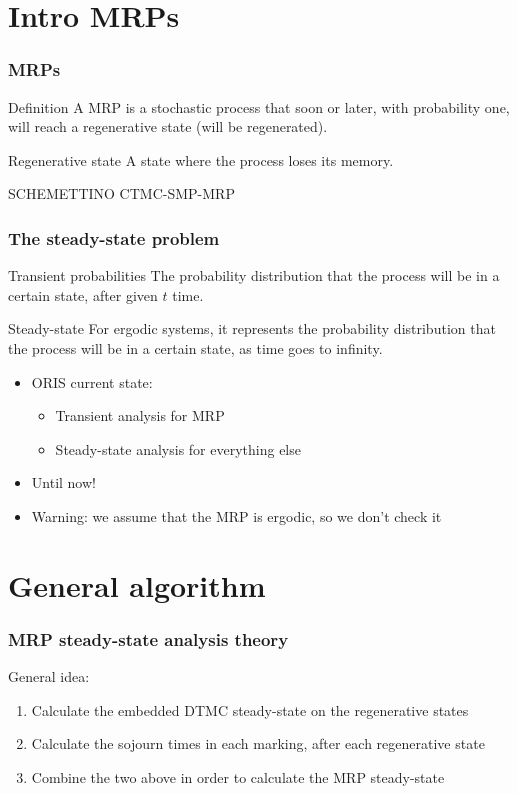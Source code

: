 \section{Intro \acfp{MRP}}
\begin{frame}
  \frametitle{\acfp{MRP}}
  \begin{block}{Definition}
    A \acf{MRP} is a stochastic process that soon or later, with
    probability one, will
    reach a \alert{regenerative} state (will be regenerated).
  \end{block}
  \pause
  \begin{block}{Regenerative state}
    A state where the process loses its memory. 
  \end{block}
  \pause
  SCHEMETTINO CTMC-SMP-MRP
\end{frame}

\begin{frame}
  \frametitle{The steady-state problem}
  \begin{block}{Transient probabilities}
    The probability distribution that the process will be in a certain
    state, after given $t$ time.
  \end{block}
  \pause
  \begin{block}{Steady-state}
    For ergodic systems, it represents the probability distribution
    that the
    process will be in a certain state, as time goes to infinity.
  \end{block}
  \pause
  \begin{itemize}
  \item ORIS current state:
    \begin{itemize}
    \item Transient analysis for \ac{MRP}
    \item Steady-state analysis for everything else
    \end{itemize}
    \pause
  \item Until now! 
    \pause
  \item \alert{Warning:} we assume that the \ac{MRP} is ergodic, so we don't check it
  \end{itemize}
\end{frame}

\section{General algorithm}
\begin{frame}
  \frametitle{\ac{MRP} steady-state analysis theory}
  General idea:
  \pause
  \begin{enumerate}
  \item Calculate the embedded \ac{DTMC} steady-state on the
    regenerative states
  \pause
  \item Calculate the sojourn times in each marking, after each
    regenerative state
  \pause
  \item Combine the two above in order to calculate the \ac{MRP} steady-state
  \end{enumerate}
\end{frame}

